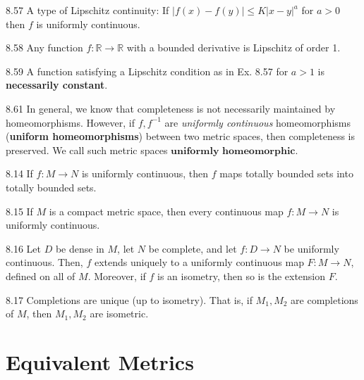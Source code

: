 \begin{exercise}{8.57}
    A type of Lipschitz continuity: If $\lvert f(x) - f(y) \rvert \leq K \lvert x - y \rvert^a$ for $a > 0$ then $f$ is uniformly continuous.
\end{exercise}

\begin{exercise}{8.58}
    Any function $f: \mathbb{R} \rightarrow \mathbb{R}$ with a bounded derivative is Lipschitz of order 1.
\end{exercise}

\begin{exercise}{8.59}
    A function satisfying a Lipschitz condition as in Ex. 8.57 for $a > 1$ is \textbf{necessarily constant}.
\end{exercise}

\begin{exercise}{8.61}
    In general, we know that completeness is not necessarily maintained by homeomorphisms.
    However, if $f, f^{-1}$ are \textit{uniformly continuous} homeomorphisms (\textbf{uniform homeomorphisms}) between two metric spaces, then completeness is preserved.
    We call such metric spaces $\textbf{uniformly homeomorphic}$.
\end{exercise}

\begin{proposition}{8.14}
    If $f: M \rightarrow N$ is uniformly continuous, then $f$ maps totally bounded sets into totally bounded sets.
\end{proposition}

\begin{theorem}{8.15}
    If $M$ is a compact metric space, then every continuous map $f: M \rightarrow N$ is uniformly continuous.
\end{theorem}

\begin{theorem}{8.16}
    Let $D$ be dense in $M$, let $N$ be complete, and let $f: D \rightarrow N$ be uniformly continuous.
    Then, $f$ extends uniquely to a uniformly continuous map $F: M \rightarrow N$, defined on all of $M$.
    Moreover, if $f$ is an isometry, then so is the extension $F$.
\end{theorem}

\begin{corollary}{8.17}
    Completions are unique (up to isometry).
    That is, if $M_1, M_2$ are completions of $M$, then $M_1, M_2$ are isometric.
\end{corollary}

\section{Equivalent Metrics}

